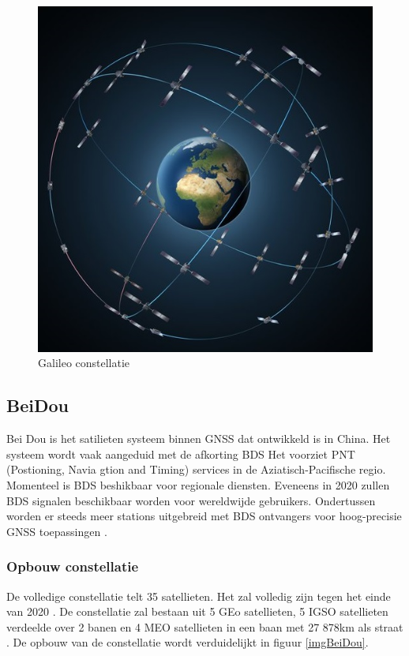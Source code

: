 \begin{figure}[hpb]
	\includegraphics[scale=1.75]{Galileo.jpg}
	\caption{Galileo constellatie \cite{LImgGalileo}}
	\label{imgGalileo}
\end{figure} 
 
\subsection{BeiDou}
\label{LBeD}
Bei Dou is het satilieten systeem binnen GNSS dat ontwikkeld is in China. Het systeem wordt vaak  aangeduid met de afkorting BDS \cite{LBibBeiDou} Het voorziet PNT (Postioning, Navia gtion and Timing) services in de Aziatisch-Pacifische regio. Momenteel is BDS  beshikbaar voor regionale diensten. Eveneens in 2020 zullen BDS signalen beschikbaar worden voor wereldwijde gebruikers. Ondertussen worden er steeds meer stations uitgebreid met BDS ontvangers voor hoog-precisie GNSS toepassingen \cite{LBibBeiDou}.

\subsubsection{Opbouw constellatie}
De volledige constellatie telt 35 satellieten. Het zal volledig zijn tegen het einde van 2020 \cite{LBibGNSS4}. De constellatie zal bestaan uit 5 GEo satellieten, 5 IGSO satellieten verdeelde over 2 banen en 4 MEO satellieten in een baan met 27 878km als straat \cite{LBibBeiDou2}. De opbouw van de constellatie wordt verduidelijkt in figuur \ref{imgBeiDou}.

